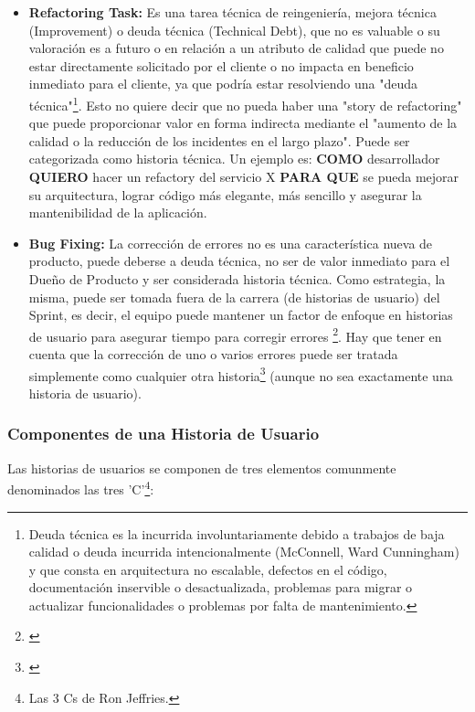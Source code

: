 \begin{itemize}
\item \textbf{Refactoring Task:}
Es una tarea técnica de reingeniería, mejora técnica (Improvement) o deuda técnica (Technical Debt), que no es valuable o su valoración es a futuro o en relación a un atributo de calidad que puede no estar directamente solicitado por el cliente o no impacta en beneficio inmediato para el cliente, ya que podría estar resolviendo una "deuda técnica"\footnote{Deuda técnica es la incurrida involuntariamente debido a trabajos de baja calidad o deuda incurrida intencionalmente (McConnell, Ward Cunningham) y que consta en arquitectura no escalable, defectos en el código, documentación inservible o desactualizada, problemas para migrar o actualizar funcionalidades o problemas por falta de mantenimiento.}. Esto no quiere decir que no pueda haber una "story de refactoring" que puede proporcionar valor en forma indirecta mediante el "aumento de la calidad o la reducción de los incidentes en el largo plazo". Puede ser categorizada como historia técnica.
Un ejemplo es: \textbf{COMO} desarrollador \textbf{QUIERO} hacer un refactory del servicio X \textbf{PARA QUE} se pueda mejorar su arquitectura, lograr código más elegante, más sencillo y asegurar la mantenibilidad de la aplicación.\newline

\item \textbf{Bug Fixing:} La corrección de errores no es una característica nueva de producto, puede deberse a deuda técnica, no ser de valor inmediato para el Dueño de Producto y ser considerada historia técnica. Como estrategia, la misma, puede ser tomada fuera de la carrera (de historias de usuario) del Sprint, es decir, el equipo puede mantener un factor de enfoque en historias de usuario para asegurar tiempo para corregir errores \footnote{\cite{Henrik-Kniberg-2007}}. Hay que tener en cuenta que la corrección de uno o varios errores puede ser tratada simplemente como cualquier otra historia\footnote{\cite{Cohn-2004}} (aunque no sea exactamente una historia de usuario).\newline

\end{itemize}

\subsubsection{Componentes de una Historia de Usuario}

Las historias de usuarios se componen de tres elementos comunmente denominados las tres 'C'\footnote{Las 3 Cs de Ron Jeffries.}:


